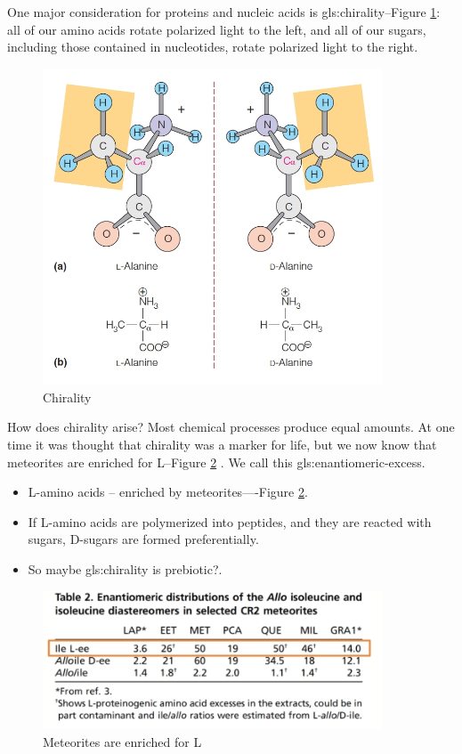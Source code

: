 \documentclass[]{article}
\begin{document}
One major consideration for proteins and nucleic acids is \gls{gls:chirality}--Figure \ref{fig:Chirality1}: all of our amino acids rotate polarized light to the left, and all of our sugars, including those contained in nucleotides, rotate polarized light  to the right. 
 
\begin{figure}[H]
	\caption{Chirality} \label{fig:Chirality1} 
	\includegraphics[width=0.9\textwidth]{Chirality1}
\end{figure}

How does chirality arise? Most chemical processes produce equal amounts. At one time it was thought that chirality was a marker for life, but we now know that meteorites are enriched for L--Figure \ref{fig:Chirality2}  \cite{pizzarello2012large}. We call this \gls{gls:enantiomeric-excess}.

\begin{itemize}
	\item L-amino acids – enriched by meteorites----Figure \ref{fig:Chirality2}.
	\item If L-amino acids are polymerized into peptides, and they are reacted with sugars, D-sugars are formed preferentially.
	\item So maybe \gls{gls:chirality} is prebiotic?.
\end{itemize}

\begin{figure}[H]
	\caption{Meteorites are enriched for L} \label{fig:Chirality2} 
	\includegraphics[width=0.9\textwidth]{Chirality2}
\end{figure}
\end{document}
